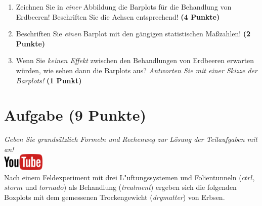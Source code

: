 \documentclass[a4paper, 9pt]{scrartcl}\usepackage[]{graphicx}\usepackage[]{xcolor}
\begin{document}
\begin{enumerate}
\item Zeichnen Sie in \textit{einer} Abbildung die Barplots f{\"u}r die
  Behandlung von Erdbeeren! Beschriften Sie die Achsen entsprechend!
  \textbf{(4 Punkte)}
\item Beschriften Sie \textit{einen} Barplot mit den g{\"a}ngigen
  statistischen Ma{\ss}zahlen! \textbf{(2 Punkte)}
\item Wenn Sie \textit{keinen Effekt} zwischen den Behandlungen von
  Erdbeeren erwarten w{\"u}rden, wie sehen dann die Barplots aus?
  \textit{Antworten Sie mit einer Skizze der Barplots!}
  \textbf{(1 Punkt)}
\end{enumerate} 
\clearpage

\section{Aufgabe \hfill (9 Punkte)}

\textit{Geben Sie grunds{\"a}tzlich Formeln und Rechenweg zur L{\"o}sung der
  Teilaufgaben mit an!} \\[1Ex]

\hfill\href{https://youtu.be/Xf0yE-o7bEU}{\includegraphics[width = 2cm]{img/youtube}}\\[1Ex] %



Nach einem Feldexperiment mit drei L{"u}ftungssystemen und Folientunneln ($ctrl$, $storm$ und $tornado$) als Behandlung
(\textit{treatment}) ergeben sich die folgenden Boxplots mit dem
gemessenen Trockengewicht (\textit{drymatter}) von Erbsen.
\end{document}
